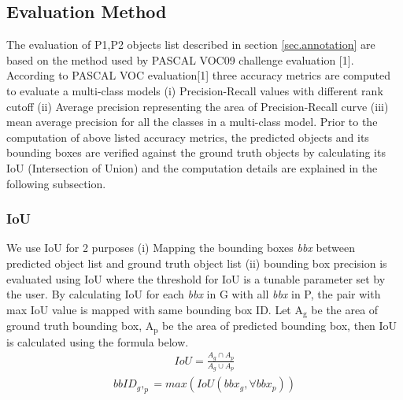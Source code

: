 \documentclass[conference]{IEEEtran}
\begin{document}
\subsection{Evaluation Method} \label{sec.evaluation}
The evaluation of P1,P2 objects list described in section \ref{sec.annotation} are based on the method used by PASCAL VOC09 challenge evaluation [1]. According to PASCAL VOC evaluation[1] three accuracy metrics are computed to evaluate a multi-class models (i) Precision-Recall values with different rank cutoff (ii) Average precision representing the area of Precision-Recall curve (iii) mean average precision for all the classes in a multi-class model. Prior to the computation of above listed accuracy metrics, the predicted objects and its bounding boxes are verified against the ground truth objects by calculating its IoU (Intersection of Union) and the computation details are explained in the following subsection.
\subsubsection{IoU} \label{ref.iou}
We use IoU for 2 purposes (i) Mapping the bounding boxes \textit{bbx} between predicted object list and ground truth object list (ii) bounding box precision is evaluated using IoU where the threshold for IoU is a tunable parameter set by the user. By calculating IoU for each \textit{bbx} in G with all  \textit{bbx} in P, the pair with max IoU value is mapped with same bounding box ID. Let  A$_{\text{g}}$ be the area of ground truth bounding box, A{$_{\text{p}}$} be the area of predicted bounding box, then IoU is calculated using the formula below.
\begin{align}
{IoU}= \frac {A_g \cap  A_p} {A_g \cup A_p}
\end{align}
\begin{align}
{bbID_g,_p} = {max ( IoU ( bbx_g , \forall  bbx_p ))}
\end{align}
\end{document}
